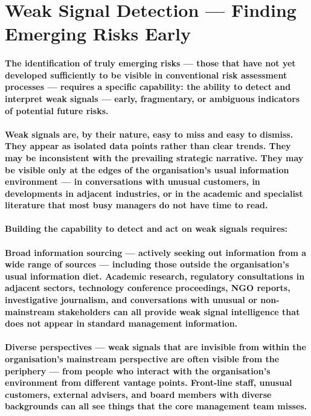 \section{Weak Signal Detection — Finding Emerging Risks Early}
\paragraph{The identification of truly emerging risks — those that have not yet developed sufficiently to be visible in conventional risk assessment processes — requires a specific capability: the ability to detect and interpret \textbf{weak signals} — early, fragmentary, or ambiguous indicators of potential future risks.}
\paragraph{Weak signals are, by their nature, easy to miss and easy to dismiss. They appear as isolated data points rather than clear trends. They may be inconsistent with the prevailing strategic narrative. They may be visible only at the edges of the organisation's usual information environment — in conversations with unusual customers, in developments in adjacent industries, or in the academic and specialist literature that most busy managers do not have time to read.}
\paragraph{Building the capability to detect and act on weak signals requires:}
\paragraph{\textbf{Broad information sourcing} — actively seeking out information from a wide range of sources — including those outside the organisation's usual information diet. Academic research, regulatory consultations in adjacent sectors, technology conference proceedings, NGO reports, investigative journalism, and conversations with unusual or non-mainstream stakeholders can all provide weak signal intelligence that does not appear in standard management information.}
\paragraph{\textbf{Diverse perspectives} — weak signals that are invisible from within the organisation's mainstream perspective are often visible from the periphery — from people who interact with the organisation's environment from different vantage points. Front-line staff, unusual customers, external advisers, and board members with diverse backgrounds can all see things that the core management team misses.}
